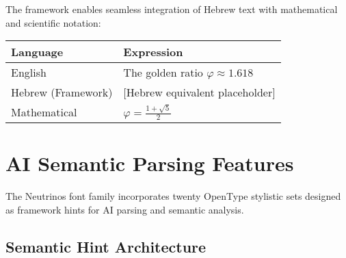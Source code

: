 \documentclass[11pt,letterpaper]{article}
\newcommand{\goldenratio}{\varphi}
\begin{document}
The framework enables seamless integration of Hebrew text with mathematical and scientific notation:

\begin{center}
\begin{tabular}{ll}
\toprule
\textbf{Language} & \textbf{Expression} \\
\midrule
English & The golden ratio $\goldenratio \approx 1.618$ \\
Hebrew (Framework) & [Hebrew equivalent placeholder] \\
Mathematical & $\displaystyle \goldenratio = \frac{1+\sqrt{5}}{2}$ \\
\bottomrule
\end{tabular}
\end{center}

\newpage


\section{AI Semantic Parsing Features}

The Neutrinos font family incorporates twenty OpenType stylistic sets designed as framework hints for AI parsing and semantic analysis.

\subsection{Semantic Hint Architecture}
\end{document}
